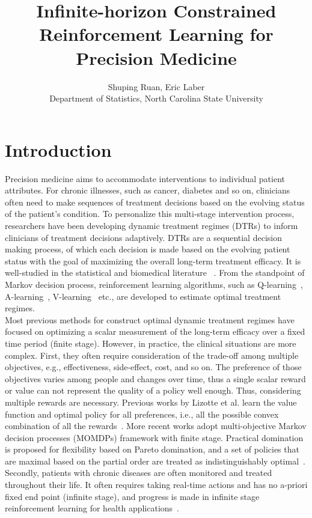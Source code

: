 \documentclass{article}
\title{Infinite-horizon Constrained Reinforcement Learning for Precision Medicine}
\author{Shuping Ruan, Eric Laber\\ Department of Statistics, North Carolina State University}
\begin{document}
\maketitle

\section{Introduction}
Precision medicine aims to accommodate interventions to individual patient attributes. For chronic illnesses, such as cancer, diabetes and so on, clinicians often need to make sequences of treatment decisions based on the evolving status of the patient's condition. To personalize this multi-stage intervention process, researchers have been developing dynamic treatment regimes (DTRs) to inform clinicians of treatment decisions adaptively. DTRs are a sequential decision making process, of which each decision is made based on the evolving patient status with the goal of maximizing the overall long-term treatment efficacy. It is well-studied in the statistical and biomedical literature ~\cite{Murphy2003, Moodie2004,Murphy2005,Zhang2012, Laber2014,Linn2014}. From the standpoint of Markov decision process, reinforcement learning algorithms, such as Q-learning~\cite{Murphy2005}, A-learning~\cite{blatt2004learning}, V-learning~\cite{Luckett2016} etc., are developed to estimate optimal treatment regimes. \\

Most previous methods for construct optimal dynamic treatment regimes have focused on optimizing a scalar measurement of the long-term efficacy over a fixed time period (finite stage).  However, in practice, the clinical situations are more complex. First, they often require consideration of the trade-off among multiple objectives, e.g., effectiveness, side-effect, cost, and so on. The preference of those objectives varies among people and changes over time, thus a single scalar reward or value can not represent the quality of a policy well enough. Thus, considering multiple rewards are necessary. Previous works by Lizotte et al. learn the value function and optimal policy for all preferences, i.e., all the possible convex combination of all the rewards~\cite{Lizotte2010,Lizotte2012}. More recent works adopt multi-objective Markov decision processes (MOMDPs) framework with finite stage. Practical domination is proposed for flexibility based on Pareto domination, and a set of policies that are maximal based on the partial order are treated as indistinguishably optimal~\cite{LaberTwo2014, Lizotte2016}. Secondly, patients with chronic diseases are often monitored and treated throughout their life. It often requires taking real-time actions and has no a-priori fixed end point (infinite stage), and progress is made in infinite stage reinforcement learning for health applications~\cite{Ertefaie2014,Murphy2016,Luckett2016}.\\
\end{document}
